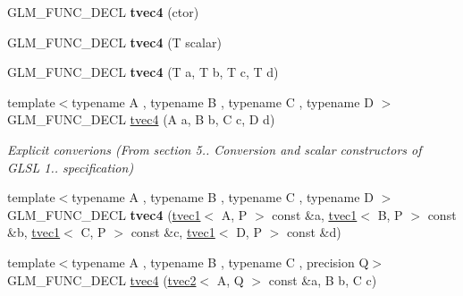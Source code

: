 \begin{DoxyCompactItemize}
\item 
\hypertarget{structglm_1_1tvec4_a3b4d7aa688c7fc353820f1468718844c}{G\-L\-M\-\_\-\-F\-U\-N\-C\-\_\-\-D\-E\-C\-L {\bfseries tvec4} (ctor)}\label{structglm_1_1tvec4_a3b4d7aa688c7fc353820f1468718844c}

\item 
\hypertarget{structglm_1_1tvec4_a6035282f7600edbbc06ce7b62c207fbc}{G\-L\-M\-\_\-\-F\-U\-N\-C\-\_\-\-D\-E\-C\-L {\bfseries tvec4} (T scalar)}\label{structglm_1_1tvec4_a6035282f7600edbbc06ce7b62c207fbc}

\item 
\hypertarget{structglm_1_1tvec4_a9b913e0ba895af72d36372b87d836dba}{G\-L\-M\-\_\-\-F\-U\-N\-C\-\_\-\-D\-E\-C\-L {\bfseries tvec4} (T a, T b, T c, T d)}\label{structglm_1_1tvec4_a9b913e0ba895af72d36372b87d836dba}

\item 
\hypertarget{structglm_1_1tvec4_a232c1b6ed2541a0f8f4ab865e9ae537f}{{\footnotesize template$<$typename A , typename B , typename C , typename D $>$ }\\G\-L\-M\-\_\-\-F\-U\-N\-C\-\_\-\-D\-E\-C\-L \hyperlink{structglm_1_1tvec4_a232c1b6ed2541a0f8f4ab865e9ae537f}{tvec4} (A a, B b, C c, D d)}\label{structglm_1_1tvec4_a232c1b6ed2541a0f8f4ab865e9ae537f}

\begin{DoxyCompactList}\small\item\em Explicit converions (From section 5.. Conversion and scalar constructors of G\-L\-S\-L 1.. specification) \end{DoxyCompactList}\item 
\hypertarget{structglm_1_1tvec4_a9c3452f0646e7424ee63f2974cb783db}{{\footnotesize template$<$typename A , typename B , typename C , typename D $>$ }\\G\-L\-M\-\_\-\-F\-U\-N\-C\-\_\-\-D\-E\-C\-L {\bfseries tvec4} (\hyperlink{structglm_1_1tvec1}{tvec1}$<$ A, P $>$ const \&a, \hyperlink{structglm_1_1tvec1}{tvec1}$<$ B, P $>$ const \&b, \hyperlink{structglm_1_1tvec1}{tvec1}$<$ C, P $>$ const \&c, \hyperlink{structglm_1_1tvec1}{tvec1}$<$ D, P $>$ const \&d)}\label{structglm_1_1tvec4_a9c3452f0646e7424ee63f2974cb783db}

\item 
\hypertarget{structglm_1_1tvec4_a386cc88c1d17ad4409030835f23c2f35}{{\footnotesize template$<$typename A , typename B , typename C , precision Q$>$ }\\G\-L\-M\-\_\-\-F\-U\-N\-C\-\_\-\-D\-E\-C\-L \hyperlink{structglm_1_1tvec4_a386cc88c1d17ad4409030835f23c2f35}{tvec4} (\hyperlink{structglm_1_1tvec2}{tvec2}$<$ A, Q $>$ const \&a, B b, C c)}\label{structglm_1_1tvec4_a386cc88c1d17ad4409030835f23c2f35}


\end{DoxyCompactItemize}
